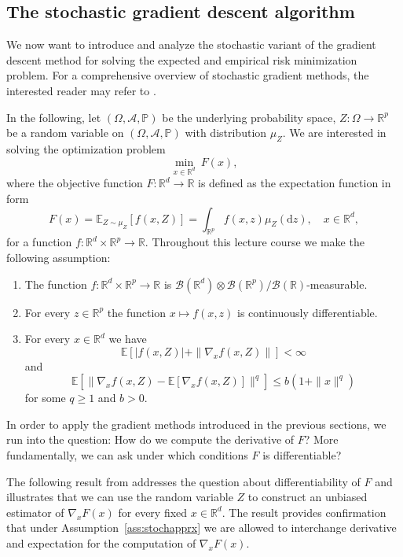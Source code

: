 \documentclass[12pt,openany]{book}
\theoremstyle{definition}
\theoremstyle{definition}
\newcommand{\E}{\mathbb{E}}
\newcommand{\R}{\mathbb{R}}
\def\P{\mathbb{P}}
\newcommand{\dd}{{\mathrm{d}}}
\begin{document}
\subsection{The stochastic gradient descent algorithm}
We now want to introduce and analyze the stochastic variant of the gradient descent method for solving the expected and empirical risk minimization problem. For a comprehensive overview of stochastic gradient methods, the interested reader may refer to \cite{Bottou2018,garrigos2023handbook,ruder2017overview}.

In the following, let $(\Omega,\mathcal A,\P)$ be the underlying probability space, $Z:\Omega\to\R^p$ be a random variable on $(\Omega,\mathcal A,\P)$ with distribution $\mu_Z$. We are interested in solving the optimization problem
\[\min_{x\in\R^d}\ F(x), \]
where the objective function $F:\R^d\to\R$ is defined as the expectation function in form
\[F(x) = \E_{Z\sim\mu_Z}[f(x,Z)] = \int_{\R^p} f(x,z)\mu_Z(\dd z),\quad x\in\R^d, \]
for a function $f:\R^d\times \R^p \to\R$. Throughout this lecture course we make the following assumption:
\begin{ass}\label{ass:stochapprx}
\begin{enumerate}
\item The function $f:\R^{d}\times\R^p\to\R$ is $\mathcal B(\R^d)\otimes\mathcal B(\R^p)/\mathcal B(\R)$-measurable.
\item For every $z\in\R^p$ the function $x\mapsto f(x,z)$ is continuously differentiable.
\item For every $x\in\R^d$ we have \[\E[|f(x,Z)| + \|\nabla_x f(x,Z)\|]<\infty\]
and \[\E[\|\nabla_x f(x,Z)-\E[\nabla_x f(x,Z)]\|^q]\le b(1+\|x\|^q)  \]
for some $q\ge1$ and $b>0$.
\end{enumerate}
\end{ass}

In order to apply the gradient methods introduced in the previous sections, we run into the question: How do we compute the derivative of $F$? More fundamentally, we can ask under which conditions $F$ is differentiable?

The following result from \cite{Jentzen2020} addresses the question about differentiability of $F$ and illustrates that we can use the random variable $Z$ to construct an unbiased estimator of $\nabla_x F(x)$ for every fixed $x\in\R^d$. The result provides confirmation that under Assumption~\ref{ass:stochapprx} we are allowed to interchange derivative and expectation for the computation of $\nabla_x F(x)$.
\end{document}
